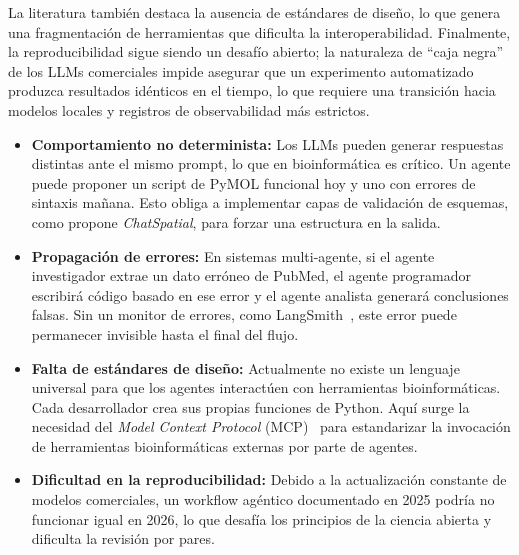 La literatura también destaca la ausencia de estándares de diseño, lo que genera
una fragmentación de herramientas que dificulta la interoperabilidad. Finalmente,
la reproducibilidad sigue siendo un desafío abierto; la naturaleza de ``caja
negra'' de los LLMs comerciales impide asegurar que un experimento automatizado
produzca resultados idénticos en el tiempo, lo que requiere una transición hacia
modelos locales y registros de observabilidad más estrictos.

\begin{itemize}
  \item \textbf{Comportamiento no determinista:} Los LLMs pueden generar
  respuestas distintas ante el mismo prompt, lo que en bioinformática es
  crítico. Un agente puede proponer un script de PyMOL funcional hoy y uno con
  errores de sintaxis mañana. Esto obliga a implementar capas de validación de
  esquemas, como propone \textit{ChatSpatial}, para forzar una estructura en la
  salida.

  \item \textbf{Propagación de errores:} En sistemas multi-agente, si el agente
  investigador extrae un dato erróneo de PubMed, el agente programador escribirá
  código basado en ese error y el agente analista generará conclusiones falsas.
  Sin un monitor de errores, como
  LangSmith~\citep{LangSmithObservability2026,LangSmithConcepts2026}, este
  error puede permanecer invisible hasta el final del flujo.

  \item \textbf{Falta de estándares de diseño:} Actualmente no existe un
  lenguaje universal para que los agentes interactúen con herramientas
  bioinformáticas. Cada desarrollador crea sus propias funciones de Python. Aquí
  surge la necesidad del \textit{Model Context Protocol}
  (MCP)~\citep{41729821} para estandarizar la invocación de herramientas
  bioinformáticas externas por parte de agentes.

  \item \textbf{Dificultad en la reproducibilidad:} Debido a la actualización
  constante de modelos comerciales, un workflow agéntico documentado en 2025
  podría no funcionar igual en 2026, lo que desafía los principios de la ciencia
  abierta y dificulta la revisión por pares.
\end{itemize}

